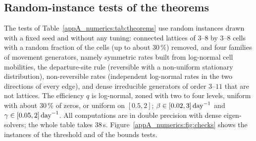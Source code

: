 \subsection{Random-instance tests of the theorems}\label{appA_numerics:sec:theorems}

The tests of Table~\ref{appA_numerics:tab:theorems} use random instances drawn with a fixed seed and without
any tuning: connected lattices of $3$--$8$ by $3$--$8$ cells with a random fraction of the cells (up to about $30\,\%$)
removed, and
four families of movement generators, namely symmetric rates built from log-normal cell mobilities,
the departure-site rule (reversible with a non-uniform stationary distribution), non-reversible rates
(independent log-normal rates in the two directions of every edge), and dense irreducible generators of order
$3$--$11$ that are not lattices. The efficiency $q$ is log-normal, zoned with two to four levels, uniform with
about $30\,\%$ of zeros, or uniform on $[0.5,2]$; $\beta\in[0.02,3]\,\mathrm{day}^{-1}$ and $\gamma\in[0.05,2]\,\mathrm{day}^{-1}$.
All computations are in double precision with dense eigen-solvers; the whole table takes 38\,s.
Figure~\ref{appA_numerics:fig:checks} shows the instances of the threshold and of the bounds tests.


